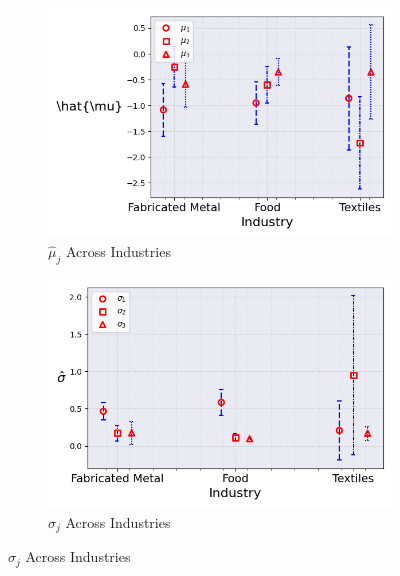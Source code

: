 \documentclass{article}
\begin{document}
\begin{figure}[ht!]
    \begin{subfigure}[t]{0.32\textwidth}
        \centering
        \includegraphics[width=\textwidth]{figure/stationary_mixture_mubar_across_industries_m3.png}
        \caption{$\hat{\mu}_j$ Across Industries}
    \end{subfigure}
    \begin{subfigure}[t]{0.32\textwidth}
        \centering
        \includegraphics[width=\textwidth]{figure/stationary_mixture_sigma_across_industries_m3.png}
        \caption{$\hat\sigma_j$ Across Industries}
    \end{subfigure}
\end{figure}
\end{document}
